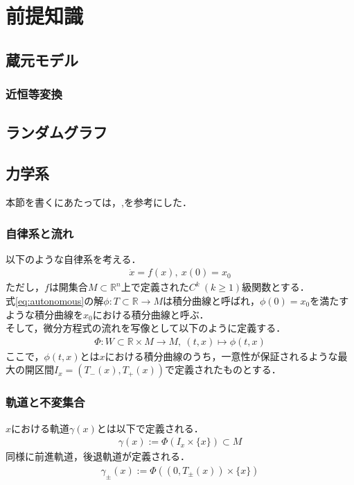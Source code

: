 \documentclass[../main]{subfiles}
\begin{document}
\chapter{前提知識}
\section{蔵元モデル}
\subsection{近恒等変換}
\section{ランダムグラフ}
\section{力学系}
本節を書くにあたっては，\cite{teschlordinary},\cite{Ciesielski+2012+2110+2128}を参考にした．
\subsection{自律系と流れ}
以下のような自律系を考える．
\begin{align}
    \label{eq:autonomous}
    \dot{x}=f(x),\ x(0)=x_0
\end{align}
ただし，$f$は開集合$M\subset \mathbb{R}^n$上で定義された$C^k\ (k\geq 1)$級関数とする．\\
式\eqref{eq:autonomous}の解$\phi:T\subset \mathbb{R}\to M$は積分曲線と呼ばれ，$\phi(0)=x_0$を満たすような積分曲線を$x_0$における積分曲線と呼ぶ．\\
そして，微分方程式の流れを写像として以下のように定義する．
\begin{align*}
    \Phi:W\subset\mathbb{R}\times M\to M,\ (t,x)\mapsto \phi(t,x)
\end{align*}
ここで，$\phi(t,x)$とは$x$における積分曲線のうち，一意性が保証されるような最大の開区間$I_x=(T_-(x),T_+(x))$で定義されたものとする．
\subsection{軌道と不変集合}
$x$における軌道$\gamma(x)$とは以下で定義される．
\begin{align*}
    \gamma(x):=\Phi(I_x\times \{x\})\subset M
\end{align*}
同様に前進軌道，後退軌道が定義される．
\begin{align*}
    \gamma_\pm(x):=\Phi((0,T_\pm (x))\times \{x\})
\end{align*}
\end{document}
